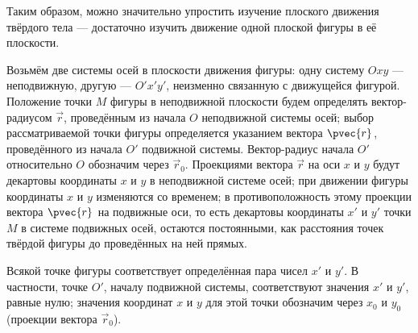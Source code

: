 Таким образом, можно значительно упростить изучение плоского движения твёрдого
тела --- достаточно изучить движение одной плоской фигуры в её плоскости.

\begin{figure}[H]
  \centering

  \caption{}
  \label{fig:14_2}
\end{figure}

Возьмём две системы осей в плоскости движения фигуры: одну систему $Oxy$ ---
неподвижную, другую --- $O'x'y'$, неизменно связанную с движущейся фигурой.
Положение точки $M$ фигуры в неподвижной плоскости будем определять
вектор-радиусом $\vec{r}$, проведённым из начала $O$ неподвижной системы осей;
выбор рассматриваемой точки фигуры определяется указанием вектора $\pvec{r}$,
проведённого из начала $O'$ подвижной системы. Вектор-радиус начала $O'$
относительно $O$ обозначим через $\vec{r}_0$. Проекциями вектора $\vec{r}$ на
оси $x$ и $y$ будут декартовы координаты $x$ и $y$ в неподвижной системе осей;
при движении фигуры координаты $x$ и $y$ изменяются со временем; в
противоположность этому проекции вектора $\pvec{r}$ на подвижные оси, то есть
декартовы координаты $x'$ и $y'$ точки $M$ в системе подвижных осей, остаются
постоянными, как расстояния точек твёрдой фигуры до проведённых на ней прямых.

Всякой точке фигуры соответствует определённая пара чисел $x'$ и $y'$. В
частности, точке $O'$, началу подвижной системы, соответствуют значения $x'$ и
$y'$, равные нулю; значения координат $x$ и $y$ для этой точки обозначим через
$x_0$ и $y_0$ (проекции вектора $\vec{r}_0$).

